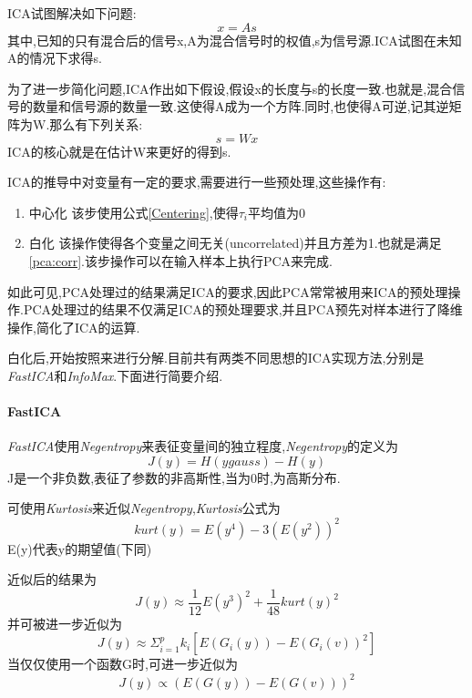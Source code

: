 ICA试图解决如下问题:\begin{equation}
	x = As
\end{equation}
其中,已知的只有混合后的信号x,A为混合信号时的权值,s为信号源.ICA试图在未知A的情况下求得s.

为了进一步简化问题,ICA作出如下假设,假设x的长度与s的长度一致.也就是,混合信号的数量和信号源的数量一致.这使得A成为一个方阵.同时,也使得A可逆,记其逆矩阵为W.那么有下列关系:
\begin{equation}
	\label{ICA:SourceDecompose}
	s=Wx
\end{equation}
ICA的核心就是在估计W来更好的得到s.\newline

ICA的推导中对变量有一定的要求,需要进行一些预处理,这些操作有:
\begin{enumerate}
	\item{中心化} 该步使用公式\ref{Centering},使得$ \tau_i$平均值为0
	\item{白化} 该操作使得各个变量之间无关(uncorrelated)并且方差为1.也就是满足\ref{pca:corr}.该步操作可以在输入样本上执行PCA来完成.
\end{enumerate}
如此可见,PCA处理过的结果满足ICA的要求,因此PCA常常被用来ICA的预处理操作.PCA处理过的结果不仅满足ICA的预处理要求,并且PCA预先对样本进行了降维操作,简化了ICA的运算.\newline

白化后,开始按照\label{ICA:SourceDecompose}来进行分解.目前共有两类不同思想的ICA实现方法,分别是\textit{FastICA}和\textit{InfoMax}.下面进行简要介绍.
	\paragraph{FastICA}	\textit{FastICA}使用\textit{Negentropy}来表征变量间的独立程度,\textit{Negentropy}的定义为
	\begin{equation}
		J(y) = H(ygauss) - H(y)
	\end{equation}
	J是一个非负数,表征了参数的非高斯性,当为0时,为高斯分布.
	
	可使用\textit{Kurtosis}来近似\textit{Negentropy},\textit{Kurtosis}公式为
	\begin{equation}
		kurt(y) = E(y^4) - 3(E(y^2))^2
	\end{equation}
	E(y)代表y的期望值(下同)
	
	近似后的结果为
	\begin{equation}
		J(y) \approx \frac{1}{12}E(y^3)^2+\frac{1}{48}kurt(y)^2
	\end{equation}
	并可被进一步近似为
	\begin{equation}
		J(y) \approx \Sigma^p_{i=1}k_i[E(G_i(y)) - E(G_i(v))^2]
	\end{equation}
	当仅仅使用一个函数G时,可进一步近似为
	\begin{equation}
	\label{ica_g}
		J(y) \propto (E(G(y)) - E(G(v)))^2
	\end{equation}
	
